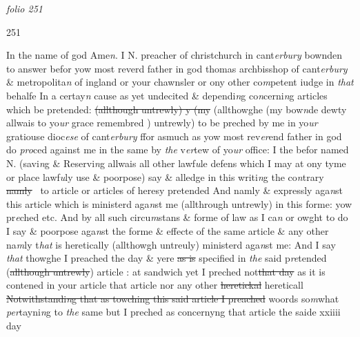 \documentclass[12pt, a4paper]{book}
\begin{document}
\textit{folio 251}



	\begin{flushright}
{\color{Mahogany}251}\end{flushright}


		\ifthenelse{\isodd{\thepage}}
		{\reversemarginpar}
		{\normalmarginpar}
		In the name of god Ame\textit{n}. I N. preacher of christchurch in cant\textit{erbury} bownden to answer befor
yow most reverd father in god thomas archbisshop of cant\textit{erbury} \& metropolita\textit{n} of ingland or your 
chawnsler or ony other co\textit{m}petent iudge in \textit{that} behalfe In a certay\textit{n} cause as yet undecited \& dependi\textit{n}g co\textit{n}cerni\textit{n}g articles which be pretended: \sout{(allthough untrewly) y (my}
(allthowghe (my bow\textit{n}de dewty allwais to yo\textit{ur} grace remembred
			 ) untrewly) to be preched by me
in yo\textit{ur} gratiouse dioc\textit{ese} of cant\textit{erbury} ffor asmuch as yow most rev\textit{er}end father in god do
\textit{pro}ced against me in the same by \textit{the} v\textit{er}tew of yo\textit{ur} office: I the befor named N. (savi\textit{n}g
\& Reservi\textit{n}g allwais all other lawf\textit{u}le defens which I may at ony tyme or place
lawf\textit{u}ly use \& poorpose) say \& alledge in this writi\textit{n}g the co\textit{n}trary \sout{namly}  to
article or articles of heresy pretended And namly \& expressly aga\textit{n}st this article which is 
ministerd aga\textit{n}st me (allthrough untrewly) in this forme: yow pr\textit{e}ched etc. And
by all such circu\textit{m}stans \& forme of law as I ca\textit{n} or owght to do I say \& 
poorpose aga\textit{n}st the forme \& effecte of the same article \& any other na\textit{m}ly t\textit{hat} 
is heretically (allthowgh untreuly) ministerd aga\textit{n}st me: And I say \textit{that} thowghe
I preached the day \& yere \sout{as is} specified in \textit{the} said p\textit{re}tended (\sout{allthough untrewly})
article : at sandwich yet I preched not\sout{that day}
               as it is contened in your article that article
			 nor any other
\sout{heretickal }hereticall \sout{Notwithstandi\textit{n}g that as towching this said article I preached} 
woords so\textit{m}what \textit{per}tayni\textit{n}g to \textit{the} same but I preched as concernyng that article the saide xxiiii day 
\end{document}
